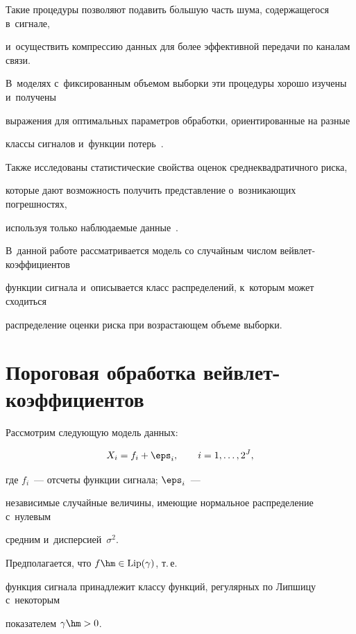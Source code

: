  Такие процедуры позволяют подавить б$\acute{\mbox{о}}$льшую часть шума, содержащегося в~сигнале, 

 и~осуществить компрессию данных для более эффективной передачи по каналам связи. 

 В~моделях с~фиксированным объемом выборки эти процедуры хорошо изучены и~получены 

 выражения для оптимальных параметров обработки, ориентированные на разные 

 классы сигналов и~функции потерь~\cite{DJ94, DJ95, DJ98, Jan01, Jan06, KS16-1}. 

 Также исследованы статистические свойства оценок среднеквадратичного риска, 

 которые дают возможность получить представление о~возникающих погрешностях, 

 используя только наблюдаемые данные~\cite{MSH10, SH12}. 

 В~данной работе рассматривается модель со случайным числом вейв\-лет-ко\-эф\-фи\-ци\-ен\-тов 

 функции сигнала и~описывается класс распределений, к~которым может сходиться 

 распределение оценки риска при возрастающем объеме выборки.



\section{Пороговая обработка вейвлет-коэффициентов}



Рассмотрим следующую модель данных:

\begin{align*}

X_i = f_i + \eps_i, \qquad i = 1, \dots, 2^J, %


\end{align*}

где $f_i$~--- отсчеты функции сигнала; $\eps_i$~--- 

независимые случайные величины, имеющие нормальное распределение с~нулевым 

средним и~дисперсией~$\sigma^2$.

Предполагается, что $f\hm\in\mathrm{Lip}(\gamma)$, т.\,е.\

 функция сигнала принадлежит классу функций, регулярных по Липшицу с~некоторым 

 показателем $\gamma\hm>0$.



